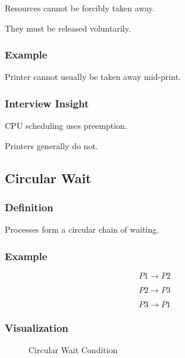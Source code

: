 Resources cannot be forcibly taken away.

They must be released voluntarily.

\subsubsection{Example}

Printer cannot usually be taken away mid-print.

\subsubsection{Interview Insight}

CPU scheduling uses preemption.

Printers generally do not.

\subsection{Circular Wait}

\subsubsection{Definition}

Processes form a circular chain of waiting.

\subsubsection{Example}

\[
P1 \rightarrow P2
\]

\[
P2 \rightarrow P3
\]

\[
P3 \rightarrow P1
\]

\subsubsection{Visualization}

\begin{figure}[H]
\centering
{}
\caption{Circular Wait Condition}
\end{figure}

